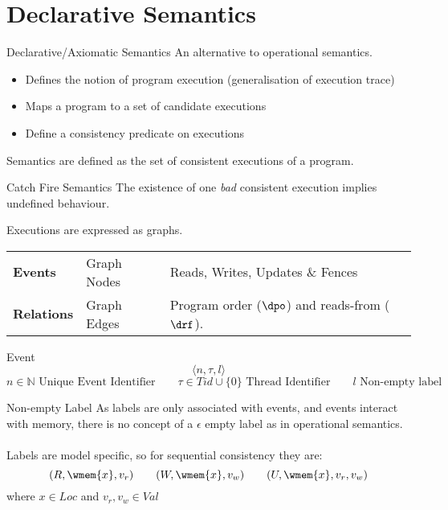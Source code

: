 \chapter{Declarative Semantics}

\begin{definitionbox}{Declarative/Axiomatic Semantics}
    An alternative to operational semantics.
    \begin{itemize}
        \item Defines the notion of program execution (generalisation of execution trace)
        \item Maps a program to a set of candidate executions
        \item Define a consistency predicate on executions
    \end{itemize}
    Semantics are defined as the set of consistent executions of a program.
\end{definitionbox}
\begin{definitionbox}{Catch Fire Semantics}
    The existence of one \textit{bad} consistent execution implies undefined behaviour.
\end{definitionbox}
Executions are expressed as graphs.
\begin{center}
    \begin{tabular}{l l p{}}
        \textbf{Events} & Graph Nodes & Reads, Writes, Updates \& Fences \\
        \textbf{Relations} & Graph Edges & Program order ($\dpo$) and reads-from ($\drf$). \\
    \end{tabular}
\end{center}

\begin{definitionbox}{Event}
    \[\langle n, \tau, l \rangle\]
    \[
        n \in \mathbb{N}  \text{ Unique Event Identifier} \qquad
        \tau \in Tid \cup \{0\}  \text{ Thread Identifier} \qquad
        l \text{ Non-empty label}
    \]
\end{definitionbox}
\begin{definitionbox}{Non-empty Label}
    As labels are only associated with events, and events interact with memory, there is no concept of a $\epsilon$ empty label as in operational semantics.
    \\
    \\ Labels are model specific, so for sequential consistency they are:
    \[(R, \wmem{x}, v_r) \qquad (W, \wmem{x}, v_w) \qquad (U, \wmem{x}, v_r, v_w)\]
    where $x \in Loc$ and $v_r, v_w \in Val$
\end{definitionbox}

